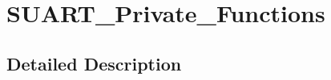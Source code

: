 \hypertarget{group___s_u_a_r_t___private___functions}{}\section{S\+U\+A\+R\+T\+\_\+\+Private\+\_\+\+Functions}
\label{group___s_u_a_r_t___private___functions}


\subsection{Detailed Description}
